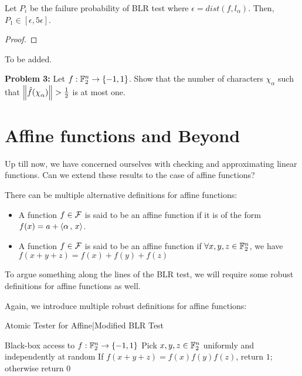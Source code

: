 \begin{theorem}
    Let $P_i$ be the failure probability of BLR test where $\epsilon = dist(f,l_\alpha)$. Then, $P_1 \in [\epsilon,5\epsilon]$.

    \begin{proof}
        
    \end{proof}
\end{theorem}

\begin{idea}
    To be added.
\end{idea}

\textbf{Problem 3:} Let ${f} : {\mathbb{F}_2^n} \rightarrow {\{-1,1\}}$. Show that the number of characters $\chi_\alpha$ such that $\norm{\fhat(\chi_\alpha)} > \frac{1}{2}$ is at most one.


\section{Affine functions and Beyond}

Up till now, we have concerned ourselves with checking and approximating linear functions. Can we extend these results to the case of affine functions?

\begin{definition}
There can be multiple alternative definitions for affine functions:
\begin{itemize}
    \item A function $f \in \mathcal{F}$ is said to be an affine function if it is of the form $f(x) = a + \left\langle {\alpha} \,,\, {x} \right\rangle$.
    \item A function $f \in \mathcal{F}$ is said to be an affine function if $\forall x,y,z \in \mathbb{F}_2^n$, we have $f(x+y+z) = f(x)+f(y)+f(z)$
\end{itemize}
\end{definition}

To argue something along the lines of the BLR test, we will require some robust definitions for affine functions as well.

\begin{definition}
    Again, we introduce multiple robust definitions for affine functions:
\end{definition}

\begin{algorithm}
    \caption{Atomic Tester for Affine|Modified BLR Test}\label{Alg: Atomic Affine Test}
    \begin{algorithmic}
        \Require Black-box access to ${f} : {\mathbb{F}_2^n} \rightarrow {\{-1,1\}}$
        \State Pick $x,y,z \in \mathbb{F}_2^n$ uniformly and independently at random
        \State If $f(x+y+z) = f(x)f(y)f(z)$, return $1$; otherwise return $0$
    \end{algorithmic}
\end{algorithm}

